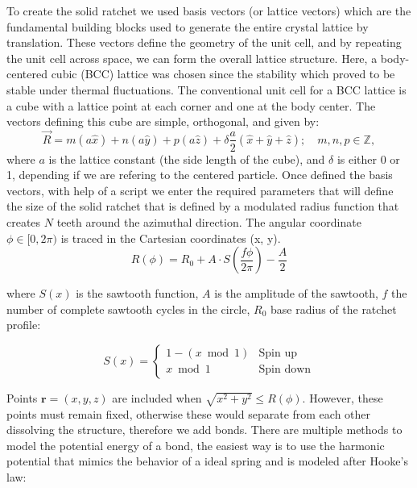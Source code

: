 To create the solid ratchet we used basis vectors (or lattice vectors) which are the fundamental building blocks used to generate the entire crystal lattice by translation. These vectors define the geometry of the unit cell, and by repeating the unit cell across space, we can form the overall lattice structure. Here, a body-centered cubic (BCC) lattice was chosen since the stability which proved to be stable under thermal fluctuations.
The conventional unit cell for a BCC lattice is a cube with a lattice point at each corner and one at the body center. The vectors defining this cube are simple, orthogonal, and given by:
%
\begin{equation}
  \vec{R} = m(a\hat{x}) + n(a\hat{y}) + p(a\hat{z}) + \delta \frac{a}{2}(\hat{x} + \hat{y} + \hat{z}); \quad m,n,p \in \mathbb{Z},
\end{equation}
%
where \( a \) is the lattice constant (the side length of the cube), and $\delta$ is either 0 or 1, depending if we are refering to the centered particle. Once defined the basis vectors, with help of a script we enter the required parameters that will define the size of the solid ratchet that is defined by a modulated radius function that creates $N$ teeth around the azimuthal direction. The angular coordinate $\phi \in [0, 2\pi)$ is traced in the Cartesian coordinates (x, y).
\begin{equation}
R(\phi) = R_0 + A \cdot S\left(\frac{f\phi}{2\pi}\right) - \frac{A}{2}
\end{equation}

where $S(x)$ is the sawtooth function, $A$ is the amplitude of the sawtooth, $f$ the number of complete sawtooth cycles in the circle, $R_0$ base radius of the ratchet profile:

\begin{equation}
S(x) = \begin{cases}
1 - (x \bmod 1) & \text{Spin up} \\
x \bmod 1 & \text{Spin down}
\end{cases}
\end{equation}

Points $\mathbf{r} = (x, y, z)$ are included when $\sqrt{x^2 + y^2} \leq R(\phi)$.
However, these points must remain fixed, otherwise these would separate from each other dissolving the structure, therefore we add bonds.
There are multiple methods to model the potential energy of a bond, the easiest way is to use the harmonic potential that mimics the behavior of a ideal spring and is modeled after Hooke's law:

